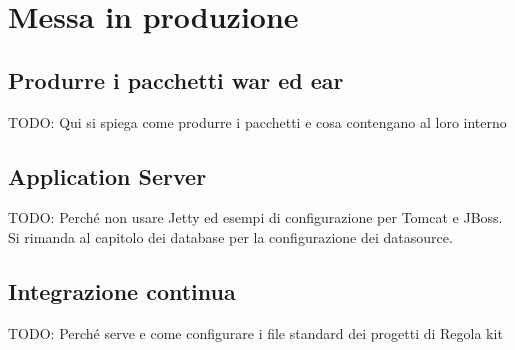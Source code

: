 \chapter{Messa in produzione}\label{chap:produzione}

\section{Produrre i pacchetti war ed ear}
TODO: Qui si spiega come produrre i pacchetti e cosa contengano al loro interno

\section{Application Server}
TODO: Perché non usare Jetty ed esempi di configurazione per Tomcat e JBoss. Si rimanda al capitolo dei database per la configurazione dei datasource.

\section{Integrazione continua}
TODO: Perché serve e come configurare i file standard dei progetti di Regola kit